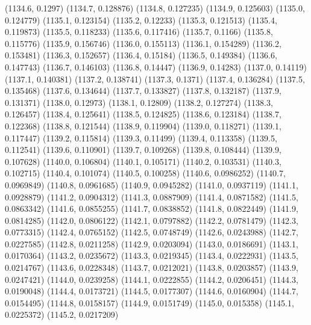 {					(1134.6, 0.1297)
					(1134.7, 0.128876)
					(1134.8, 0.127235)
					(1134.9, 0.125603)
					(1135.0, 0.124779)
					(1135.1, 0.123154)
					(1135.2, 0.12233)
					(1135.3, 0.121513)
					(1135.4, 0.119873)
					(1135.5, 0.118233)
					(1135.6, 0.117416)
					(1135.7, 0.1166)
					(1135.8, 0.115776)
					(1135.9, 0.156746)
					(1136.0, 0.155113)
					(1136.1, 0.154289)
					(1136.2, 0.153481)
					(1136.3, 0.152657)
					(1136.4, 0.15184)
					(1136.5, 0.149384)
					(1136.6, 0.147743)
					(1136.7, 0.146103)
					(1136.8, 0.14447)
					(1136.9, 0.14283)
					(1137.0, 0.14119)
					(1137.1, 0.140381)
					(1137.2, 0.138741)
					(1137.3, 0.1371)
					(1137.4, 0.136284)
					(1137.5, 0.135468)
					(1137.6, 0.134644)
					(1137.7, 0.133827)
					(1137.8, 0.132187)
					(1137.9, 0.131371)
					(1138.0, 0.12973)
					(1138.1, 0.12809)
					(1138.2, 0.127274)
					(1138.3, 0.126457)
					(1138.4, 0.125641)
					(1138.5, 0.124825)
					(1138.6, 0.123184)
					(1138.7, 0.122368)
					(1138.8, 0.121544)
					(1138.9, 0.119904)
					(1139.0, 0.118271)
					(1139.1, 0.117447)
					(1139.2, 0.115814)
					(1139.3, 0.11499)
					(1139.4, 0.113358)
					(1139.5, 0.112541)
					(1139.6, 0.110901)
					(1139.7, 0.109268)
					(1139.8, 0.108444)
					(1139.9, 0.107628)
					(1140.0, 0.106804)
					(1140.1, 0.105171)
					(1140.2, 0.103531)
					(1140.3, 0.102715)
					(1140.4, 0.101074)
					(1140.5, 0.100258)
					(1140.6, 0.0986252)
					(1140.7, 0.0969849)
					(1140.8, 0.0961685)
					(1140.9, 0.0945282)
					(1141.0, 0.0937119)
					(1141.1, 0.0928879)
					(1141.2, 0.0904312)
					(1141.3, 0.0887909)
					(1141.4, 0.0871582)
					(1141.5, 0.0863342)
					(1141.6, 0.0855255)
					(1141.7, 0.0838852)
					(1141.8, 0.0822449)
					(1141.9, 0.0814285)
					(1142.0, 0.0806122)
					(1142.1, 0.0797882)
					(1142.2, 0.0781479)
					(1142.3, 0.0773315)
					(1142.4, 0.0765152)
					(1142.5, 0.0748749)
					(1142.6, 0.0243988)
					(1142.7, 0.0227585)
					(1142.8, 0.0211258)
					(1142.9, 0.0203094)
					(1143.0, 0.0186691)
					(1143.1, 0.0170364)
					(1143.2, 0.0235672)
					(1143.3, 0.0219345)
					(1143.4, 0.0222931)
					(1143.5, 0.0214767)
					(1143.6, 0.0228348)
					(1143.7, 0.0212021)
					(1143.8, 0.0203857)
					(1143.9, 0.0247421)
					(1144.0, 0.0239258)
					(1144.1, 0.0222855)
					(1144.2, 0.0206451)
					(1144.3, 0.0190048)
					(1144.4, 0.0173721)
					(1144.5, 0.0177307)
					(1144.6, 0.0160904)
					(1144.7, 0.0154495)
					(1144.8, 0.0158157)
					(1144.9, 0.0151749)
					(1145.0, 0.015358)
					(1145.1, 0.0225372)
					(1145.2, 0.0217209)
}
